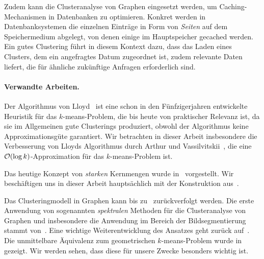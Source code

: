 Zudem kann die Clusteranalyse von Graphen eingesetzt werden, um Caching-Mechanismen in Datenbanken zu optimieren.
Konkret werden in Datenbanksystemen die einzelnen Einträge in Form von \emph{Seiten} auf dem Speichermedium abgelegt,
von denen einige im Hauptspeicher gecached werden. Ein gutes Clustering führt in diesem Kontext dazu, dass das Laden eines
Clusters, dem ein angefragtes Datum zugeordnet ist, zudem relevante Daten liefert, die für ähnliche zukünftige Anfragen
erforderlich sind.

\paragraph{Verwandte Arbeiten.} Der Algorithmus von Lloyd~\cite{Lloyd82} ist eine schon in den Fünfzigerjahren entwickelte
Heuristik für das $k$-means-Problem, die bis heute von praktischer Relevanz ist, da sie im Allgemeinen gute Clusterings
produziert, obwohl der Algorithmus keine Approximationsgüte garantiert. Wir betrachten in dieser Arbeit insbesondere die
Verbesserung von Lloyds Algorithmus durch Arthur und Vassilvitskii~\citep{ArthurV07}, die eine $\mathcal{O}(\log k)$-Approximation
für das $k$-means-Problem ist.

Das heutige Konzept von \emph{starken} Kernmengen wurde in~\cite{HarPeledM04} vorgestellt. Wir beschäftigen uns in dieser Arbeit
hauptsächlich mit der Konstruktion aus~\cite{FeldmanSS13,Schmidt14}.

Das Clusteringmodell in Graphen kann bis zu~\cite{KernighanL70} zurückverfolgt werden. Die erste Anwendung von sogenannten
\emph{spektralen} Methoden für die Clusteranalyse von Graphen und insbesondere die Anwendung im Bereich der Bildsegmentierung
stammt von~\cite{ShiM00}. Eine wichtige Weiterentwicklung des Ansatzes geht zurück auf~\cite{NgJW01}. Die unmittelbare
Äquivalenz zum geometrischen $k$-means-Problem wurde in~\cite{DhillonGK04,DhillonGK07} gezeigt. Wir werden sehen, dass diese
für unsere Zwecke besonders wichtig ist.

